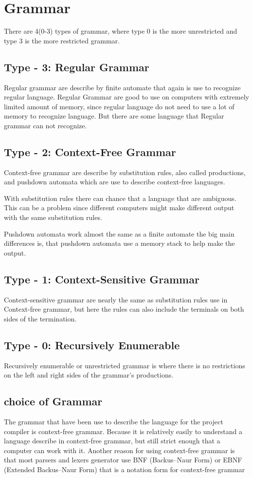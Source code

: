 \section{Grammar}
There are 4(0-3) types of grammar, where type 0 is the more unrestricted and type 3 is the more restricted grammar.

\subsection{Type - 3: Regular Grammar}
Regular grammar are describe by finite automate that again is use to recognize regular language. Regular Grammar are good to use on computers with extremely limited amount of memory, since regular language do not need to use a lot of memory to recognize language. But there are some language that Regular grammar can not recognize.

\subsection{Type - 2: Context-Free Grammar}
Context-free grammar are describe by substitution rules, also called productions, and pushdown automata which are use to describe context-free languages.

With substitution rules there can chance that a language that are ambiguous. 
This can be a problem since different computers might make different output with the same substitution rules.

Pushdown automata work almost the same as a finite automate the big main differences is, that pushdown automata use a memory stack to help make the output.

\subsection{Type - 1: Context-Sensitive Grammar}
Context-sensitive grammar are nearly the same as substitution rules use in Context-free grammar, but here the rules can also include the terminals on both sides of the termination.

\subsection{Type - 0: Recursively Enumerable}
Recursively enumerable or unrestricted grammar is where there is no restrictions on the left and right sides of the grammar's productions.

\subsection{choice of Grammar}
The grammar that have been use to describe the language for the  project compiler is context-free grammar. Because it is relatively easily to understand a language describe in context-free grammar, but still strict enough that a computer can work with it. Another reason for using context-free grammar is that most parsers and lexers generator use BNF (Backus–Naur Form) or EBNF (Extended Backus–Naur Form) that is a notation form for context-free grammar